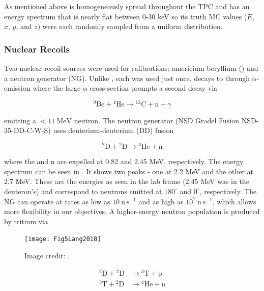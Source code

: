\noindent  As mentioned above  is homogeneously spread throughout the TPC and has an energy spectrum that is nearly flat
between 0-30 keV so its truth MC values ($E$, $x$, $y$, and $z$) were each randomly sampled from a uniform distribution.



\subsubsection{Nuclear Recoils}
\label{subsubsec:er_nr_calibrations_parameter_determ_nr}
Two nuclear recoil sources were used for calibrations: americium beryllium (\ambe) and a neutron generator (NG).  Unlike ,
each was used just once.  \ambe decays to  through $\alpha$-emission where the large  $\alpha$ cross-section
prompts a second decay via

\begin{equation}
\mathrm{^{9}Be} + \mathrm{^{4}He} \rightarrow \mathrm{^{12}C + n} + \gamma
\end{equation}

\noindent emitting a $< 11\ \mathrm{MeV}$ neutron.  The neutron generator (NSD Gradel Fusion NSD-35-DD-C-W-S) uses
deuterium-deuterium (DD) fusion

\begin{equation}
\mathrm{^{2}D} + \mathrm{^{2}D} \rightarrow \mathrm{^{3}He} + \mathrm{n}
\end{equation}

\noindent where the  and n are expelled at 0.82 and 2.45 MeV, respectively.  The energy spectrum can be seen in
.  It shows two peaks - one at 2.2 MeV and the other at 2.7 MeV.  These
are the energies as seen in the lab frame (2.45 MeV was in the deuteron's) and correspond to neutrons emitted at $180^{\circ}$ and
$0^{\circ}$, respectively.  The NG can operate at rates as low as $10\ \mathrm{n\ s^{-1}}$
and as high as $10^7\ \mathrm{n\ s^{-1}}$, which allows more flexibility in our objectives.  A higher-energy neutron
population is produced by tritium via

\begin{figure}
\centering
\texttt{[image: Fig5Lang2018]}
\caption{Image credit: .}
\label{fig:er_nr_calibrations_parameter_determ_nr_ng_energy}
\end{figure}

\begin{equation}
\begin{aligned}
\mathrm{^{2}D} + \mathrm{^{2}D} &\rightarrow \mathrm{^{3}T} + \mathrm{p} \\
\mathrm{^{3}T} + \mathrm{^{2}D} &\rightarrow \mathrm{^{4}He} + \mathrm{n}
\end{aligned}
\end{equation}

